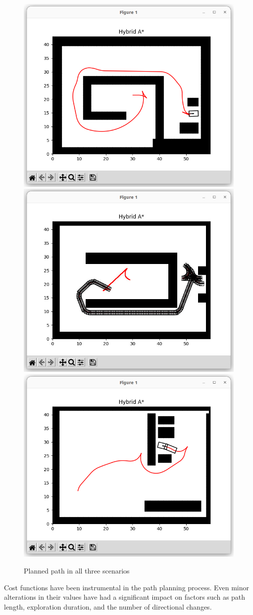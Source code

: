 \documentclass[12pt,a4paper]{article}
\begin{document}
\begin{figure}[htbp!]
\begin{center}
\includegraphics[width=0.3 \columnwidth]{results/car/Car-planned_path.png}
\includegraphics[width=0.3 \columnwidth]{results/diffbot/diffbot_planned_path.jpeg}
\includegraphics[width=0.3 \columnwidth]{results/truck/Truck-Planned_path.png}



\end{center}
\caption{Planned path in all three scenarios}
\label{fig:Occupancy_grid}
\end{figure}

Cost functions have been instrumental in the path planning process. Even minor alterations in their values have had a significant impact on factors such as path length, exploration duration, and the number of directional changes.
\end{document}
